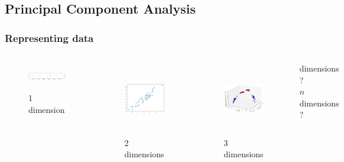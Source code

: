 \documentclass{beamer}
\begin{document}
\subsection{Principal Component Analysis}
\begin{frame}
  \frametitle{Representing data}
  \begin{columns}
      \begin{figure}
        \centering
        \includegraphics[height=1.2cm]{img/pca_1dim.png}
        \caption{1 dimension}
      \end{figure}
      \begin{figure}
        \centering
        \includegraphics[height=3.2cm]{img/pca_2dim.png}
        \caption{2 dimensions}
      \end{figure}

      \begin{figure}
        \centering
        \includegraphics[height=3.2cm]{img/pca_3dim.png}
        \caption{3 dimensions}
      \end{figure}
      \parbox{\linewidth}{
         dimensions ?\\
        $n$ dimensions ?}
  \end{columns}
\end{frame}
\end{document}
